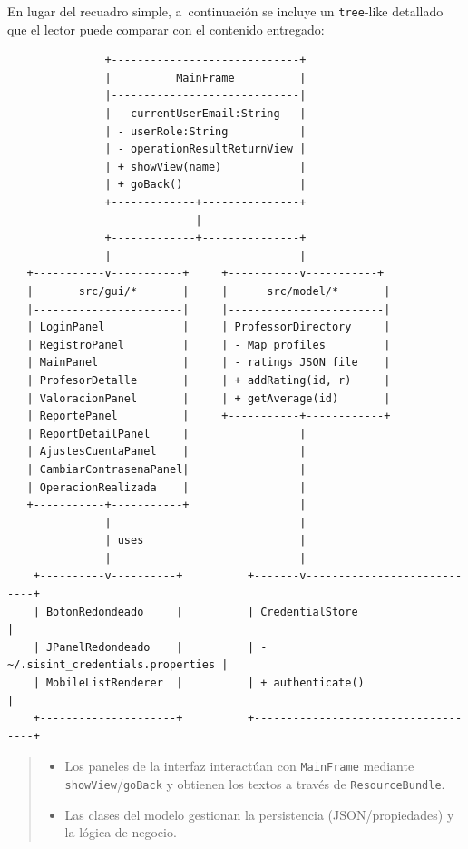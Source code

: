 \documentclass[12pt,oneside]{book}
\begin{document}
En lugar del recuadro simple, a\ continuaci\'on se incluye un \texttt{tree}-like detallado que el lector puede comparar con el contenido entregado:

\begin{verbatim}
               +-----------------------------+
               |          MainFrame          |
               |-----------------------------|
               | - currentUserEmail:String   |
               | - userRole:String           |
               | - operationResultReturnView |
               | + showView(name)            |
               | + goBack()                  |
               +-------------+---------------+
                             |
               +-------------+---------------+
               |                             |
   +-----------v-----------+     +-----------v-----------+
   |       src/gui/*       |     |      src/model/*       |
   |-----------------------|     |------------------------|
   | LoginPanel            |     | ProfessorDirectory     |
   | RegistroPanel         |     | - Map profiles         |
   | MainPanel             |     | - ratings JSON file    |
   | ProfesorDetalle       |     | + addRating(id, r)     |
   | ValoracionPanel       |     | + getAverage(id)       |
   | ReportePanel          |     +-----------+------------+
   | ReportDetailPanel     |                 |
   | AjustesCuentaPanel    |                 |
   | CambiarContrasenaPanel|                 |
   | OperacionRealizada    |                 |
   +-----------+-----------+                 |
               |                             |
               | uses                        |
               |                             |
    +----------v----------+          +-------v----------------------------+
    | BotonRedondeado     |          | CredentialStore                    |
    | JPanelRedondeado    |          | - ~/.sisint_credentials.properties |
    | MobileListRenderer  |          | + authenticate()                   |
    +---------------------+          +------------------------------------+

\end{verbatim}
\begin{quote}
\begin{itemize}
    \item Los paneles de la interfaz interactúan con \texttt{MainFrame} mediante \texttt{showView}/\texttt{goBack} y obtienen los textos a través de \texttt{ResourceBundle}.
    \item Las clases del modelo gestionan la persistencia (JSON/propiedades) y la lógica de negocio.
\end{itemize}
\end{quote}
\end{document}
